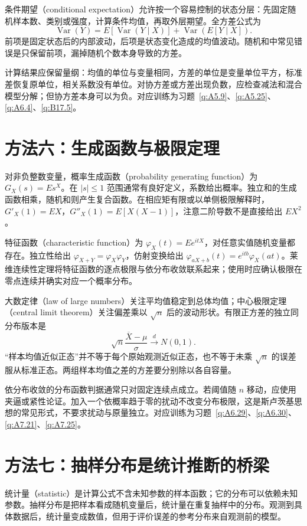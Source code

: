 \documentclass[UTF8,12pt,a4paper,fontset=fandol]{ctexart}
\begin{document}
条件期望（conditional expectation）允许按一个容易控制的状态分层：先固定随机样本数、类别或强度，计算条件均值，再取外层期望。全方差公式为
\[
\operatorname{Var}(Y)=E[\operatorname{Var}(Y\mid X)]+\operatorname{Var}(E[Y\mid X]).
\]
前项是固定状态后的内部波动，后项是状态变化造成的均值波动。随机和中常见错误是只保留前项，漏掉随机个数本身导致的方差。

计算结果应保留量纲：均值的单位与变量相同，方差的单位是变量单位平方，标准差恢复原单位，相关系数没有单位。对协方差或方差出现负数，应检查减法和混合模型分解；但协方差本身可以为负。对应训练为习题~\ref{q:A5.9}、\ref{q:A5.25}、\ref{q:A6.4}、\ref{q:B17.5}。

\section*{方法六：生成函数与极限定理}
对非负整数变量，概率生成函数（probability generating function）为 $G_X(s)=Es^X$。在 $|s|\le1$ 范围通常有良好定义，系数给出概率。独立和的生成函数相乘，随机和则产生复合函数。在相应矩有限或以单侧极限解释时，$G'_X(1)=EX$，$G''_X(1)=E[X(X-1)]$，注意二阶导数不是直接给出 $EX^2$。

特征函数（characteristic function）为 $\varphi_X(t)=Ee^{itX}$，对任意实值随机变量都存在。独立性给出 $\varphi_{X+Y}=\varphi_X\varphi_Y$，仿射变换给出 $\varphi_{aX+b}(t)=e^{itb}\varphi_X(at)$。莱维连续性定理将特征函数的逐点极限与依分布收敛联系起来；使用时应确认极限在零点连续并确实对应一个概率分布。

大数定律（law of large numbers）关注平均值稳定到总体均值；中心极限定理（central limit theorem）关注偏差乘以 $\sqrt n$ 后的波动形状。有限正方差的独立同分布版本是
\[
\sqrt n\frac{\overline X-\mu}{\sigma}\xrightarrow dN(0,1).
\]
“样本均值近似正态”并不等于每个原始观测近似正态，也不等于未乘 $\sqrt n$ 的误差服从标准正态。两组样本均值之差的方差要分别除以各自容量。

依分布收敛的分布函数判据通常只对固定连续点成立。若阈值随 $n$ 移动，应使用夹逼或紧性论证。加入一个依概率趋于零的扰动不改变分布极限，这是斯卢茨基思想的常见形式，不要求扰动与原量独立。对应训练为习题~\ref{q:A6.29}、\ref{q:A6.30}、\ref{q:A7.21}、\ref{q:A7.25}。

\section*{方法七：抽样分布是统计推断的桥梁}
统计量（statistic）是计算公式不含未知参数的样本函数；它的分布可以依赖未知参数。抽样分布是把样本看成随机变量后，统计量在重复抽样中的分布。观测到具体数据后，统计量变成数值，但用于评价误差的参考分布来自观测前的模型。
\end{document}

